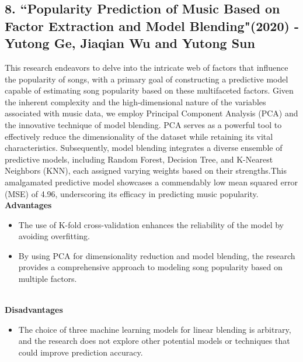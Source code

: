 \documentclass[11pt]{report}
\begin{document}
\subsection*{8. ``Popularity Prediction of Music Based on Factor Extraction and Model Blending"(2020) - 
Yutong Ge, Jiaqian Wu and Yutong Sun \cite{reference8}}
This research endeavors to delve into the intricate web of factors that influence the popularity of songs, with a primary goal of constructing a predictive model capable of estimating song popularity based on these multifaceted factors. Given the inherent complexity and the high-dimensional nature of the variables associated with music data, we employ Principal Component Analysis (PCA) and the innovative technique of model blending. PCA serves as a powerful tool to effectively reduce the dimensionality of the dataset while retaining its vital characteristics. Subsequently, model blending integrates a diverse ensemble of predictive models, including Random Forest, Decision Tree, and K-Nearest Neighbors (KNN), each assigned varying weights based on their strengths.This amalgamated predictive model showcases a commendably low mean squared error (MSE) of 4.96, underscoring its efficacy in predicting music popularity.
\clearpage
\textbf{Advantages}
    \begin{itemize}
        \item The use of K-fold cross-validation enhances the reliability of the model by avoiding overfitting.
        \item By using PCA for dimensionality reduction and model blending, the research provides a comprehensive approach to modeling song popularity based on multiple factors.
    \end{itemize}
\\    
    \textbf{Disadvantages}
    \begin{itemize}
        \item The choice of three machine learning models for linear blending is arbitrary, and the research does not explore other potential models or techniques that could improve prediction accuracy.
    \end{itemize}
\\\\
\end{document}
